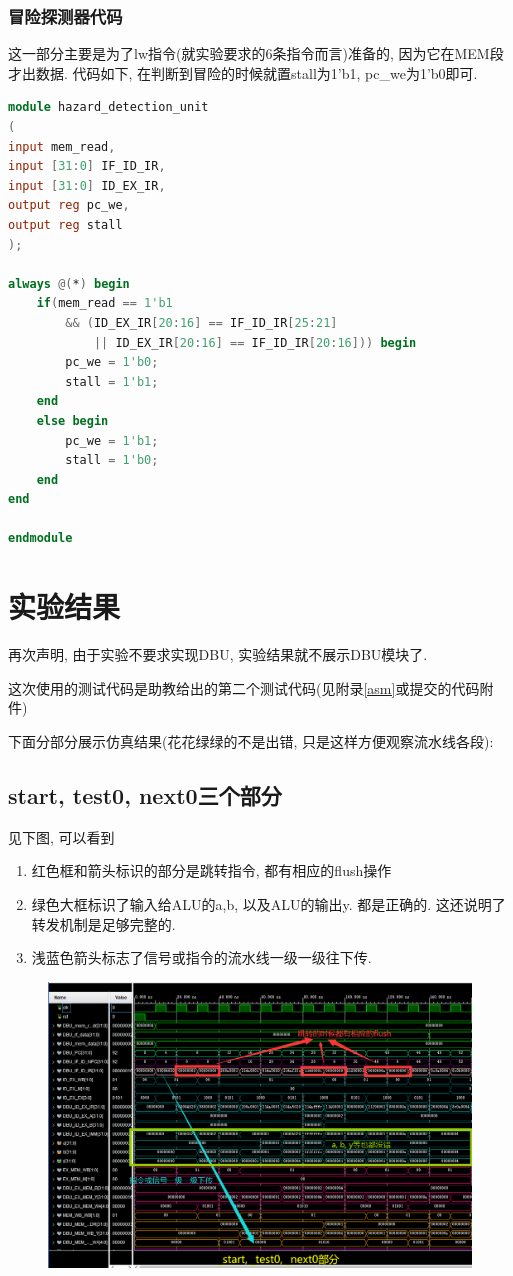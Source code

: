 \documentclass[UTF8]{article}
\begin{document}
\subsubsection{冒险探测器代码}
这一部分主要是为了lw指令(就实验要求的6条指令而言)准备的, 因为它在MEM段才出数据. 代码如下, 在判断到冒险的时候就置stall为1'b1, pc\_we为1'b0即可.
\begin{lstlisting}[language=verilog]
module hazard_detection_unit
(
input mem_read,
input [31:0] IF_ID_IR,
input [31:0] ID_EX_IR,
output reg pc_we,
output reg stall
);

always @(*) begin
    if(mem_read == 1'b1 
        && (ID_EX_IR[20:16] == IF_ID_IR[25:21] 
            || ID_EX_IR[20:16] == IF_ID_IR[20:16])) begin
        pc_we = 1'b0;
        stall = 1'b1;
    end
    else begin
        pc_we = 1'b1;
        stall = 1'b0;
    end
end    
    
endmodule
\end{lstlisting}

\section{实验结果}
再次声明, 由于实验不要求实现DBU, 实验结果就不展示DBU模块了.\par
这次使用的测试代码是助教给出的第二个测试代码(见附录\ref{asm}或提交的代码附件)\par
下面分部分展示仿真结果(花花绿绿的不是出错, 只是这样方便观察流水线各段):
\subsection{start, test0, next0三个部分}
见下图, 可以看到
\begin{enumerate}
	\item 红色框和箭头标识的部分是跳转指令, 都有相应的flush操作
	\item 绿色大框标识了输入给ALU的a,b, 以及ALU的输出y. 都是正确的. 这还说明了转发机制是足够完整的.
	\item 浅蓝色箭头标志了信号或指令的流水线一级一级往下传.
\end{enumerate}
\begin{figure}[H]
	\centering
	\includegraphics[width=\linewidth]{start_test0_next0.png}
\end{figure}
\end{document}
